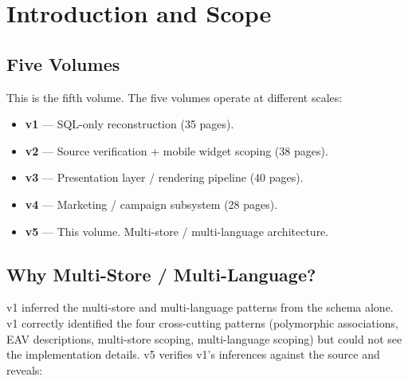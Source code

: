 \documentclass[11pt,a4paper]{article}
\begin{document}
\newpage
\tableofcontents
\newpage

\section{Introduction and Scope}\label{sec:intro}

\subsection{Five Volumes}

This is the fifth volume. The five volumes operate at different scales:

\begin{itemize}[leftmargin=1.6em,itemsep=2pt]
  \item \textbf{v1} --- SQL-only reconstruction (35 pages).
  \item \textbf{v2} --- Source verification + mobile widget scoping (38 pages).
  \item \textbf{v3} --- Presentation layer / rendering pipeline (40 pages).
  \item \textbf{v4} --- Marketing / campaign subsystem (28 pages).
  \item \textbf{v5} --- This volume. Multi-store / multi-language architecture.
\end{itemize}

\subsection{Why Multi-Store / Multi-Language?}

v1 inferred the multi-store and multi-language patterns from the schema
alone. v1 correctly identified the four cross-cutting patterns
(polymorphic associations, EAV descriptions, multi-store scoping,
multi-language scoping) but could not see the implementation details. v5
verifies v1's inferences against the source and reveals:
\end{document}
